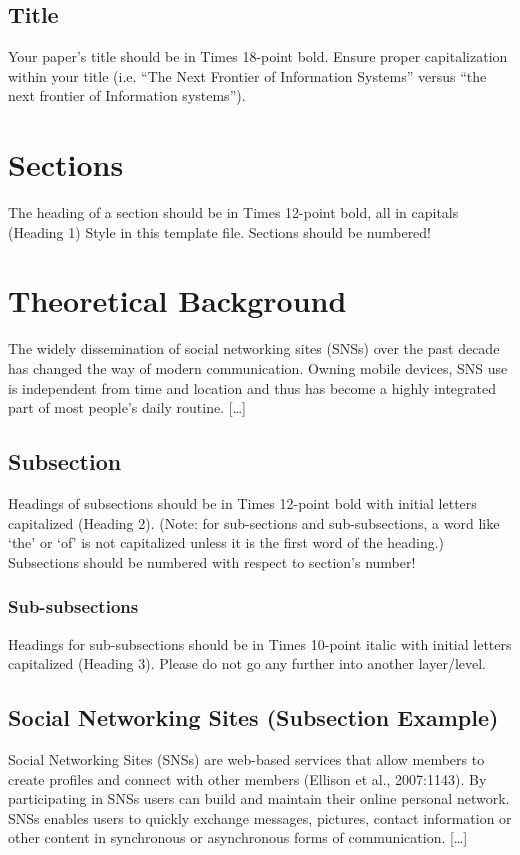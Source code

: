 \documentclass[11pt]{article}
\begin{document}
\subsection{Title}
Your paper's title should be in Times 18-point bold. Ensure proper capitalization within your title (i.e. “The Next Frontier of Information Systems” versus “the next frontier of Information systems”).

\section{Sections}
The heading of a section should be in Times 12-point bold, all in capitals (Heading 1) Style in this template file. Sections should be numbered!

\section{Theoretical Background}
The widely dissemination of social networking sites (SNSs) over the past decade has changed the way of modern communication. Owning mobile devices, SNS use is independent from time and location and thus has become a highly integrated part of most people's daily routine. […]

\subsection{Subsection}
Headings of subsections should be in Times 12-point bold with initial letters capitalized (Heading 2). (Note: for sub-sections and sub-subsections, a word like ‘the' or ‘of' is not capitalized unless it is the first word of the heading.) Subsections should be numbered with respect to section's number!
\subsubsection{Sub-subsections}
Headings for sub-subsections should be in Times 10-point italic with initial letters capitalized (Heading 3). Please do not go any further into another layer/level.

\subsection{Social Networking Sites (Subsection Example)}
Social Networking Sites (SNSs) are web-based services that allow members to create profiles and connect with other members (Ellison et al., 2007:1143). By participating in SNSs users can build and maintain their online personal network. SNSs enables users to quickly exchange messages, pictures, contact information or other content in synchronous or asynchronous forms of communication. […]
\end{document}
